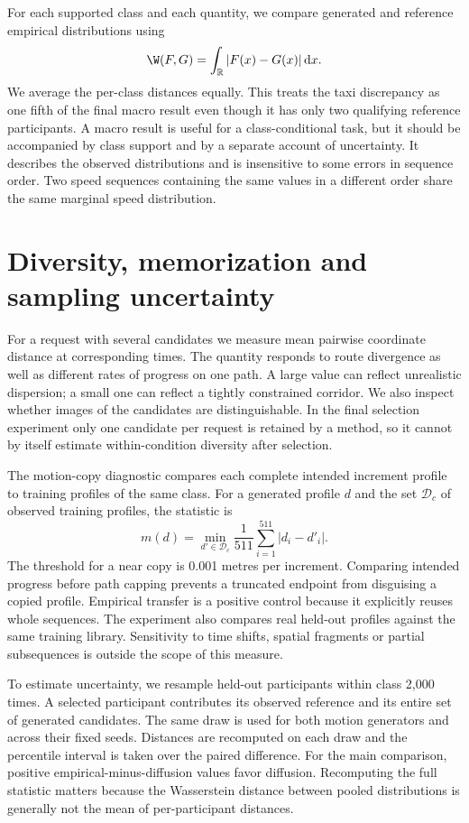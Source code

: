 For each supported class and each quantity, we compare generated and reference empirical distributions using
\begin{equation}
 \W(F,G)=\int_{\mathbb R}|F(x)-G(x)|\,\mathrm{d}x .
\end{equation}
We average the per-class distances equally. This treats the taxi discrepancy as one fifth of the final macro result even though it has only two qualifying reference participants. A macro result is useful for a class-conditional task, but it should be accompanied by class support and by a separate account of uncertainty. It describes the observed distributions and is insensitive to some errors in sequence order. Two speed sequences containing the same values in a different order share the same marginal speed distribution.

\section{Diversity, memorization and sampling uncertainty}
For a request with several candidates we measure mean pairwise coordinate distance at corresponding times. The quantity responds to route divergence as well as different rates of progress on one path. A large value can reflect unrealistic dispersion; a small one can reflect a tightly constrained corridor. We also inspect whether images of the candidates are distinguishable. In the final selection experiment only one candidate per request is retained by a method, so it cannot by itself estimate within-condition diversity after selection.

The motion-copy diagnostic compares each complete intended increment profile to training profiles of the same class. For a generated profile $d$ and the set $\mathcal D_c$ of observed training profiles, the statistic is
\begin{equation}
 m(d)=\min_{d'\in\mathcal D_c}\frac{1}{511}\sum_{i=1}^{511}|d_i-d'_i|.
\end{equation}
The threshold for a near copy is 0.001 metres per increment. Comparing intended progress before path capping prevents a truncated endpoint from disguising a copied profile. Empirical transfer is a positive control because it explicitly reuses whole sequences. The experiment also compares real held-out profiles against the same training library. Sensitivity to time shifts, spatial fragments or partial subsequences is outside the scope of this measure.

To estimate uncertainty, we resample held-out participants within class 2,000 times. A selected participant contributes its observed reference and its entire set of generated candidates. The same draw is used for both motion generators and across their fixed seeds. Distances are recomputed on each draw and the percentile interval is taken over the paired difference. For the main comparison, positive empirical-minus-diffusion values favor diffusion. Recomputing the full statistic matters because the Wasserstein distance between pooled distributions is generally not the mean of per-participant distances.

